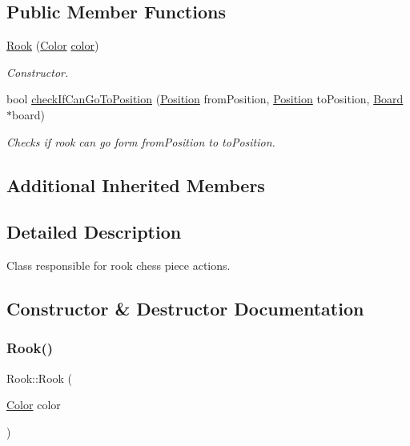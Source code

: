 \subsection*{Public Member Functions}
\begin{DoxyCompactItemize}
\item 
\hyperlink{classRook_ad737fa250eb3e4d1a312d9bceda6a9cd}{Rook} (\hyperlink{Enums_8h_ab87bacfdad76e61b9412d7124be44c1c}{Color} \hyperlink{classChessPiece_a8c8fc170e7c719ac2b71a93a56a38f01}{color})
\begin{DoxyCompactList}\small\item\em Constructor. \end{DoxyCompactList}\item 
bool \hyperlink{classRook_aad67c9012197bf285cf6a27861fbcb06}{check\+If\+Can\+Go\+To\+Position} (\hyperlink{classPosition}{Position} from\+Position, \hyperlink{classPosition}{Position} to\+Position, \hyperlink{classBoard}{Board} $\ast$board)
\begin{DoxyCompactList}\small\item\em Checks if rook can go form from\+Position to to\+Position. \end{DoxyCompactList}\end{DoxyCompactItemize}
\subsection*{Additional Inherited Members}


\subsection{Detailed Description}
Class responsible for rook chess piece actions. 

\subsection{Constructor \& Destructor Documentation}
\mbox{\label{classRook_ad737fa250eb3e4d1a312d9bceda6a9cd}} 
\subsubsection{\texorpdfstring{Rook()}{Rook()}}
{\footnotesize\ttfamily Rook\+::\+Rook (\begin{DoxyParamCaption}\item[{\hyperlink{Enums_8h_ab87bacfdad76e61b9412d7124be44c1c}{Color}}]{color }\end{DoxyParamCaption})\hspace{0.3cm}{\ttfamily [inline]}}



